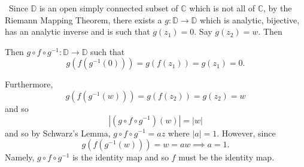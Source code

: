 \documentclass[12pt]{Qual}
\begin{document}
\begin{solution}$\,$
Since $\mathbb{D}$ is an open simply connected subset of $\mathbb{C}$ which is not all of $\mathbb{C}$, by the Riemann Mapping Theorem, there exists a $g:\mathbb{D}\to\mathbb{D}$ which is analytic, bijective, has an analytic inverse and is such that $g(z_1)=0$. Say $g(z_2)=w$. Then

Then $g\circ f\circ g^{-1}:\mathbb{D}\to\mathbb{D}$ such that $$g(f(g^{-1}(0)))=g(f(z_1))=g(z_1)=0.$$

Furthermore, $$g(f(g^{-1}(w)))=g(f(z_2))=g(z_2)=w$$ and so $$|(g\circ f\circ g^{-1})(w)|=|w|$$ and so by Schwarz's Lemma, $g\circ f\circ g^{-1}=az$ where $|a|=1$. However, since $$g(f(g^{-1}(w)))=w=aw\implies a=1.$$ Namely, $g\circ f\circ g^{-1}$ is the identity map and so $f$ must be the identity map.
\end{solution}
\end{document}
